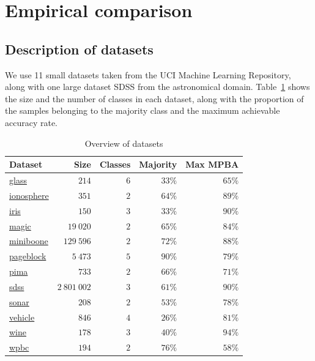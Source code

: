 \documentclass[fleqn,10pt,lineno]{wlpeerj} %
\begin{document}
\section*{Empirical comparison}

\subsection*{Description of datasets}

We use 11 small datasets taken from the UCI Machine Learning Repository, along
with one large dataset SDSS from the astronomical domain.
Table~\ref{tab:datasets} shows the size and the number of classes in each
dataset, along with the proportion of the samples belonging to the majority
class and the maximum achievable accuracy rate.

\begin{table}[h]
	\caption {Overview of datasets} \label{tab:datasets}
	\centering
	\begin{tabular}{lrrrr}
		\toprule
		{Dataset}  & Size &  Classes & Majority & Max MPBA \\
		\midrule
        \href{https://archive.ics.uci.edu/ml/datasets/Glass+Identification}{glass}
        	& $214$ & $6$ & $33\%$ & $65\%$ \\
		\href{https://archive.ics.uci.edu/ml/datasets/Ionosphere}{ionosphere}
        	& $351$ & $2$ & $64\%$ & $89\%$ \\
        \href{https://archive.ics.uci.edu/ml/datasets/Iris}{iris}
        	& $150$ & $3$ & $33\%$ & $90\%$ \\
        \href{https://archive.ics.uci.edu/ml/datasets/MAGIC+Gamma+Telescope}{magic}
        	& $19~020$ & $2$ & $65\%$ & $84\%$ \\
        \href{https://archive.ics.uci.edu/ml/datasets/MiniBooNE+particle+identification}{miniboone}
        	& $129~596$ & $2$ & $72\%$ & $88\%$ \\
        \href{https://archive.ics.uci.edu/ml/datasets/Page+Blocks+Classification}{pageblock}
        	& $5~473$ & $5$ & $90\%$ & $79\%$ \\
		\href{https://archive.ics.uci.edu/ml/datasets/Pima+Indians+Diabetes}{pima}
        	& $733$ & $2$ & $66\%$ & $71\%$ \\
        \href{http://dx.doi.org/10.5281/zenodo.58500}{sdss}
        	& $2~801~002$ & $3$ & $61\%$ & $90\%$ \\
		\href{https://archive.ics.uci.edu/ml/datasets/Connectionist+Bench+(Sonar,+Mines+vs.+Rocks)}{sonar}
        	& $208$ & $2$ & $53\%$ & $78\%$ \\
        \href{https://archive.ics.uci.edu/ml/datasets/Statlog+(Vehicle+Silhouettes)}{vehicle}
        	& $846$ & $4$ & $26\%$ & $81\%$ \\
        \href{https://archive.ics.uci.edu/ml/datasets/Wine}{wine}
        	& $178$ & $3$ & $40\%$ & $94\%$ \\
		\href{https://archive.ics.uci.edu/ml/datasets/Breast+Cancer+Wisconsin+(Prognostic)}{wpbc}
        	& $194$ & $2$ & $76\%$ & $58\%$ \\
		\bottomrule
	\end{tabular}
\end{table}
\end{document}
